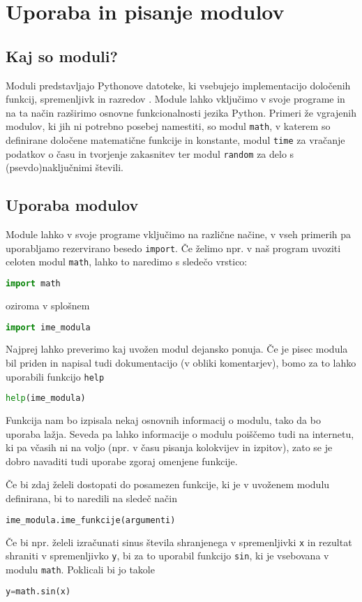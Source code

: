 \chapter{Uporaba in pisanje modulov}
\label{ch:moduli}

\section{Kaj so moduli?}

Moduli predstavljajo Pythonove datoteke, ki vsebujejo implementacijo določenih funkcij, spremenljivk in razredov . Module lahko vključimo v svoje programe in na ta način razširimo osnovne funkcionalnosti jezika Python. Primeri že vgrajenih modulov, ki jih ni potrebno posebej namestiti, so modul \texttt{math}, v katerem so definirane določene matematične funkcije in konstante, modul \texttt{time} za vračanje podatkov o času in tvorjenje zakasnitev ter modul \texttt{random} za delo s (psevdo)naključnimi števili.

\section{Uporaba modulov}

Module lahko v svoje programe vključimo na različne načine, v vseh primerih pa uporabljamo rezervirano besedo \texttt{import}. Če želimo npr. v naš program uvoziti celoten modul \texttt{math}, lahko to naredimo s sledečo vrstico:
\begin{lstlisting}[language=Python]
import math
\end{lstlisting}
oziroma v splošnem
\begin{lstlisting}[language=Python]
import ime_modula
\end{lstlisting}
Najprej lahko preverimo kaj uvožen modul dejansko ponuja. Če je pisec modula bil priden in napisal tudi dokumentacijo (v obliki komentarjev), bomo za to lahko uporabili funkcijo \texttt{help}
\begin{lstlisting}[language=Python]
help(ime_modula)
\end{lstlisting}
Funkcija nam bo izpisala nekaj osnovnih informacij o modulu, tako da bo uporaba lažja. Seveda pa lahko informacije o modulu poiščemo tudi na internetu, ki pa včasih ni na voljo (npr. v času pisanja kolokvijev in izpitov), zato se je dobro navaditi tudi uporabe zgoraj omenjene funkcije.

Če bi zdaj želeli dostopati do posamezen funkcije, ki je v uvoženem modulu definirana, bi to naredili na sledeč način
\begin{lstlisting}[language=Python]
ime_modula.ime_funkcije(argumenti)
\end{lstlisting}
Če bi npr. želeli izračunati sinus števila shranjenega v spremenljivki \texttt{x} in rezultat shraniti v spremenljivko \texttt{y}, bi za to uporabil funkcijo \texttt{sin}, ki je vsebovana v modulu \texttt{math}. Poklicali bi jo takole
\begin{lstlisting}[language=Python]
y=math.sin(x)
\end{lstlisting}

